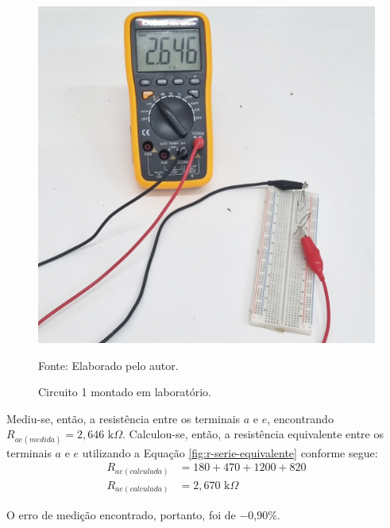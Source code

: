 \documentclass[12pt]{article}
\begin{document}
    \begin{figure}[H]
        \centering
        \caption{Circuito 1 montado em laboratório.}
        \begin{minipage}{0.5\textwidth}
            \centering
            \includegraphics[width=\textwidth]{external-figures/parte1.png}\\
            \raggedright\footnotesize{Fonte: Elaborado pelo autor.}
            \label{fig:pratica1}
        \end{minipage}
    \end{figure}

    Mediu-se, então, a resistência entre os terminais $a$ e $e$, encontrando $R_{ae(medida)}=2,646\text{ k}\Omega$. Calculou-se, então, a resistência equivalente entre os terminais $a$ e $e$ utilizando a Equação \ref{fig:r-serie-equivalente} conforme segue:
    \begin{align*}
        R_{ae(calculada)}&=180 + 470 + 1200 + 820\\
        R_{ae(calculada)}&=2,670\text{ k}\Omega
    \end{align*}

    O erro de medição encontrado, portanto, foi de $-$0,90\%.
\end{document}
